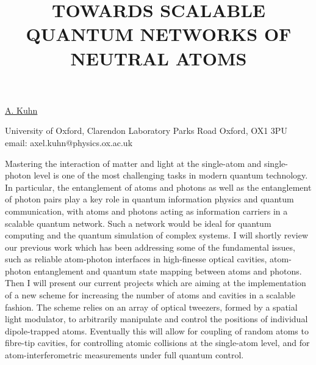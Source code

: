 \title{TOWARDS SCALABLE QUANTUM NETWORKS OF NEUTRAL ATOMS}

\underline{A. Kuhn}


University of Oxford,
Clarendon Laboratory
Parks Road
Oxford, OX1 3PU\\
email: axel.kuhn@physics.ox.ac.uk

Mastering the interaction of matter and light at the single-atom and single-photon level is one of the most challenging tasks in
modern quantum technology. In particular, the entanglement of atoms and photons as well as the entanglement of photon pairs
play a key role in quantum information physics and quantum communication, with atoms and photons acting as information
carriers in a scalable quantum network. Such a network would be ideal for quantum computing and the quantum simulation of
complex systems.
I will shortly review our previous work which has been addressing some of the fundamental issues, such as reliable atom-photon
interfaces in high-finesse optical cavities, atom-photon entanglement and quantum state mapping between atoms and photons. Then I will present our current projects which are aiming at the implementation of a new scheme for increasing the number of
atoms and cavities in a scalable fashion. The scheme relies on an array of optical tweezers, formed by a spatial light modulator,  
to arbitrarily manipulate and control the positions of individual dipole-trapped atoms. Eventually this will allow for coupling of random atoms to fibre-tip cavities, for controlling atomic collisions at the single-atom level, and for atom-interferometric
measurements under full quantum control. 

\vspace{\baselineskip}